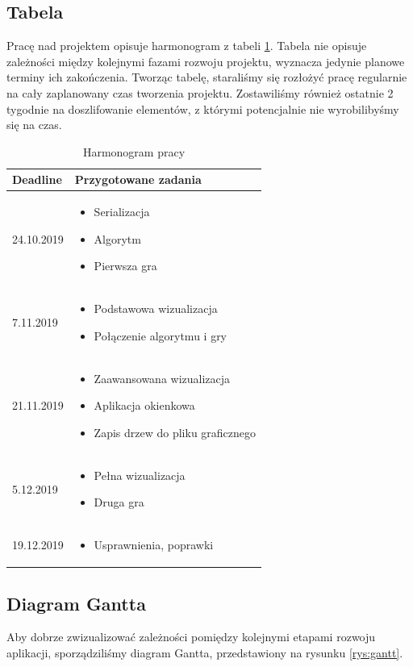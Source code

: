 \documentclass{article}
\newcommand{\tabbeditemize}[1]{
	\begin{minipage}[t]{0.4\textwidth}
		\begin{itemize}[topsep=0mm,partopsep=0mm,leftmargin=4mm]
			#1
		\end{itemize}
\end{minipage}}
\begin{document}
	\subsection{Tabela}
	Pracę nad projektem opisuje harmonogram z tabeli \ref{tab:schedule}. Tabela nie opisuje zależności między kolejnymi fazami rozwoju projektu, wyznacza jedynie planowe terminy ich zakończenia. Tworząc tabelę, staraliśmy się rozłożyć pracę regularnie na cały zaplanowany czas tworzenia projektu. Zostawiliśmy również ostatnie 2 tygodnie na doszlifowanie elementów, z którymi potencjalnie nie wyrobilibyśmy się na czas.
	\begin{table}[h!]
	\centering
	\begin{tabular}{|l|l|}
		\hline
		\textbf{Deadline}   & \textbf{Przygotowane zadania}                                                         \\ \hline
		24.10.2019 & \tabbeditemize{\item Serializacja \item Algorytm \item Pierwsza gra} \\ \hline
		7.11.2019  & \tabbeditemize{\item Podstawowa wizualizacja \item Połączenie algorytmu i gry}\\ \hline
		21.11.2019 & \tabbeditemize{\item Zaawansowana wizualizacja \item Aplikacja okienkowa \item Zapis drzew do pliku graficznego} \\ \hline
		5.12.2019  & \tabbeditemize{\item Pełna wizualizacja \item Druga gra} \\ \hline
		19.12.2019 & \tabbeditemize{\item Usprawnienia, poprawki}\\ \hline
	\end{tabular}
	\caption{Harmonogram pracy}
	\label{tab:schedule}
	\end{table}

	\subsection{Diagram Gantta}
	\noindent Aby dobrze zwizualizować zależności pomiędzy kolejnymi etapami rozwoju aplikacji, sporządziliśmy diagram Gantta, przedstawiony na rysunku \ref{rys:gantt}.
	
\end{document}
